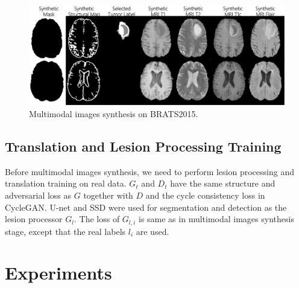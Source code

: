 \documentclass[runningheads]{llncs}
\begin{document}
	\begin{figure}[th]
		\centering
		\includegraphics[width=0.7\linewidth]{figures/F_to_MRI}
		\caption{Multimodal images synthesis on BRATS2015.}
		\label{generated_mri}
	\end{figure}
	\subsection{Translation and Lesion Processing Training}
	Before multimodal images synthesis, we need to perform lesion processing and translation training on real data. $G_t$ and $D_t$ have the same structure and adversarial loss as $G$ together with $D$ and the cycle consistency loss in CycleGAN\cite{6zhu2017unpaired}.
	U-net and SSD\cite{109liu2016ssd:} were used for segmentation and detection as the lesion processor $G_l$. The loss of $G_{l,i}$ is same as in multimodal images synthesis stage, except that the real labels $l_i$ are used.
	\section{Experiments}
\end{document}
